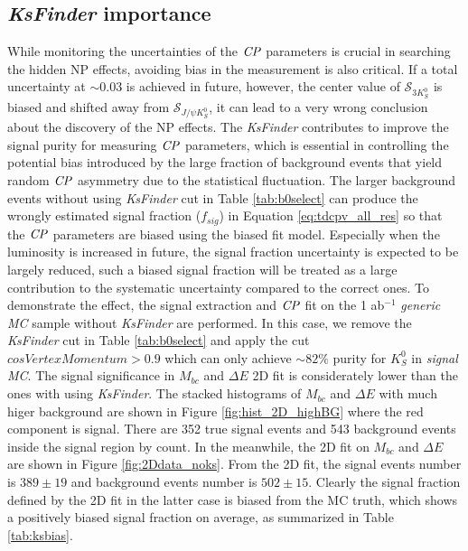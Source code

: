 \subsection{\textit{KsFinder} importance}
While monitoring the uncertainties of the $\it{CP}$ parameters is crucial in searching the hidden NP effects, avoiding bias in the measurement is also critical. If a total uncertainty at $\sim 0.03$ is achieved in future, however, the center value of $\mathcal{S}_{3K_S^0}$ is biased and shifted away from $\mathcal{S}_{J/\psi K_S^0}$, it can lead to a very wrong conclusion about the discovery of the NP effects.
The \textit{KsFinder} contributes to improve the signal purity for measuring $\it{CP}$ parameters, which is essential in controlling the potential bias introduced by the large fraction of background events that yield random $\it{CP}$ asymmetry due to the statistical fluctuation. The larger background events without using \textit{KsFinder} cut in Table \ref{tab:b0select} can produce the wrongly estimated signal fraction ($f_{sig}$) in Equation \ref{eq:tdcpv_all_res} so that the $\it{CP}$ parameters are biased using the biased fit model. Especially when the luminosity is increased in future, the signal fraction uncertainty is expected to be largely reduced, such a biased signal fraction will be treated as a large contribution to the systematic uncertainty compared to the correct ones. 
To demonstrate the effect,  the signal extraction and $\it{CP}$ fit on the 1 ab$^{-1}$ \textit{generic MC} sample without \textit{KsFinder} are performed. In this case, we remove the \textit{KsFinder} cut in Table \ref{tab:b0select} and apply the cut $cosVertexMomentum > 0.9$ which can only achieve $\sim 82\%$ purity for $K_S^0$ in \textit{signal MC}. The signal significance in $M_{bc}$ and $\Delta E$ 2D fit is considerately lower than the ones with using \textit{KsFinder}. The stacked histograms of $M_{bc}$ and $\Delta E$ with much higer background are shown in Figure \ref{fig:hist_2D_highBG} where the red component is signal. There are 352 true signal events and 543 background events inside the signal region by count. In the meanwhile, the 2D fit on $M_{bc}$ and $\Delta E$ are shown in Figure \ref{fig:2Ddata_noks}. From the 2D fit, the signal events number is $389\pm19$ and background events number is $502\pm15$. Clearly the signal fraction defined by the 2D fit in the latter case is biased from the MC truth, which shows a positively biased signal fraction on average, as summarized in Table \ref{tab:ksbias}.

